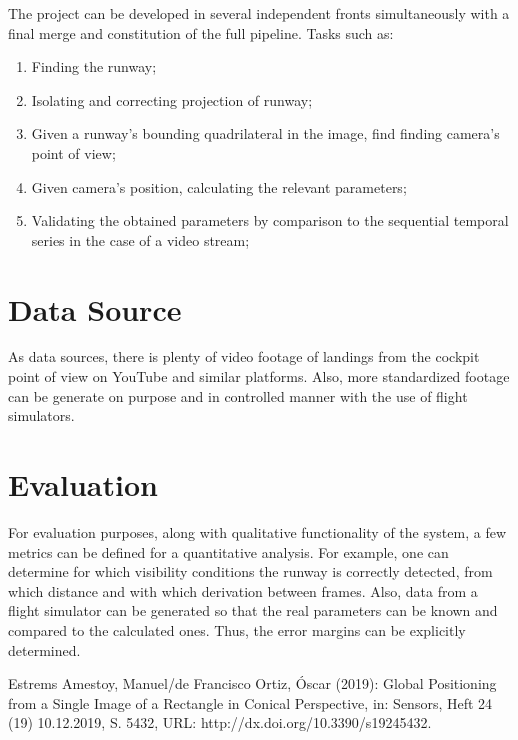 \documentclass[11pt, a4paper]{article}
\begin{document}
	The project can be developed in several independent fronts simultaneously with a final merge and constitution of the full pipeline. Tasks such as:
	
	\begin{enumerate}
		\item Finding the runway;
		\item Isolating and correcting projection of runway;
		\item Given a runway's bounding quadrilateral in the image, find finding camera's point of view;
		\item Given camera's position, calculating the relevant parameters;
		\item Validating the obtained parameters by comparison to the sequential temporal series in the case of a video stream;
	\end{enumerate}

\section{Data Source}

	As data sources, there is plenty of video footage of landings from the cockpit point of view on YouTube and similar platforms. Also, more standardized footage can be generate on purpose and in controlled manner with the use of flight simulators.

\section{Evaluation}

	For evaluation purposes, along with qualitative functionality of the system, a few metrics can be defined for a quantitative analysis. For example, one can determine for which visibility conditions the runway is correctly detected, from which distance and with which derivation between frames. Also, data from a flight simulator can be generated so that the real parameters can be known and compared to the calculated ones. Thus, the error margins can be explicitly determined.

\begin{thebibliography}{1}
Estrems Amestoy, Manuel/de Francisco Ortiz, Óscar (2019): Global Positioning from a Single Image of a Rectangle in Conical Perspective, in: Sensors, Heft 24 (19) 10.12.2019, S. 5432, URL: http://dx.doi.org/10.3390/s19245432.
\end{thebibliography}
\end{document}
